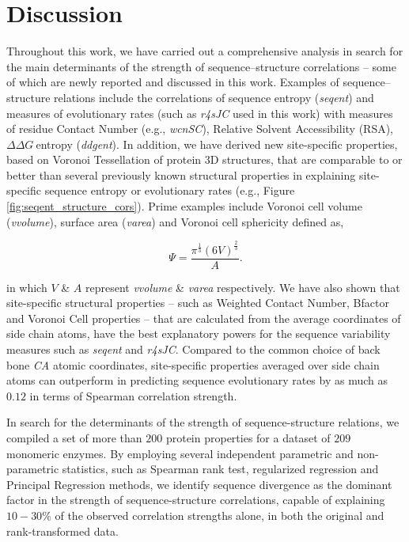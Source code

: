 \documentclass[12pt]{article}
\newcommand{\ddg}{$\Delta\Delta G~$}
\begin{document}
\section{Discussion}
\label{sec:dcr}

        Throughout this work, we have carried out a comprehensive analysis in search for the main determinants of the strength of sequence--structure correlations -- some of which are newly reported and discussed in this work. Examples of sequence--structure relations include the correlations of sequence entropy ({\it seqent}) and measures of evolutionary rates (such as {\it r4sJC} used in this work) with measures of residue Contact Number (e.g., {\it wcnSC}), Relative Solvent Accessibility (RSA), \ddg entropy ({\it ddgent}). In addition, we have derived new site-specific properties, based on Voronoi Tessellation of protein 3D structures, that are comparable to or better than several previously known structural properties in explaining site-specific sequence entropy or evolutionary rates (e.g., Figure \ref{fig:seqent_structure_cors}). Prime examples include Voronoi cell volume ({\it vvolume}), surface area ({\it varea}) and Voronoi cell sphericity defined as,

        \begin{equation}
        \label{eqn:sphericity}
        \Psi = \frac{\pi^{\frac{1}{3}}(6V)^{\frac{2}{3}}}{A}.
        \end{equation}

        in which $V$ \& $A$ represent {\it vvolume} \& {\it varea} respectively. We have also shown that site-specific structural properties -- such as Weighted Contact Number, Bfactor and Voronoi Cell properties -- that are calculated from the average coordinates of side chain atoms, have the best explanatory powers for the sequence variability measures such as {\it seqent} and {\it r4sJC}. Compared to the common choice of back bone {\it CA} atomic coordinates, site-specific properties averaged over side chain atoms can outperform in predicting sequence evolutionary rates by as much as $0.12$ in terms of Spearman correlation strength.

        In search for the determinants of the strength of sequence-structure relations, we compiled a set of more than $200$ protein properties for a dataset of $209$ monomeric enzymes. By employing several independent parametric and non-parametric statistics, such as Spearman rank test, regularized regression and Principal Regression methods, we identify sequence divergence as the dominant factor in the strength of sequence-structure correlations, capable of explaining $10-30\%$ of the observed correlation strengths alone, in both the original and rank-transformed data.
\end{document}
